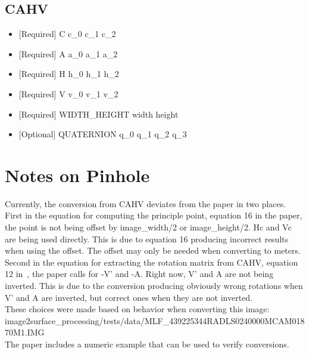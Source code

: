 \documentclass[float=false, crop=false]{standalone}
\begin{document}
\subsection{CAHV}
\begin{itemize}
	\item {[Required] C} c\_0 c\_1 c\_2\\
	\item {[Required] A} a\_0 a\_1 a\_2\\
	\item {[Required] H} h\_0 h\_1 h\_2\\
	\item {[Required] V} v\_0 v\_1 v\_2\\
	\item {[Required] WIDTH\_HEIGHT} width height\\
	\item {[Optional] QUATERNION} q\_0 q\_1 q\_2 q\_3
\end{itemize}

\section{Notes on Pinhole}
Currently, the conversion from CAHV deviates from the paper in two places.\\ First in the equation for computing the principle point, equation 16 in the paper, the point is not being offset by image\_width/2 or image\_height/2. Hc and Vc are being used directly. This is due to equation 16 producing incorrect results when using the offset. The offset may only be needed when converting to meters.\\
Second in the equation for extracting the rotation matrix from CAHV, equation 12 in~\cite{Di-Li-2003-cahvor}, the paper calls for -V' and -A. Right now, V' and A are not being inverted. This is due to the conversion producing obviously wrong rotations when V' and A are inverted, but correct ones when they are not inverted.\\
These choices were made based on behavior when converting this image:\\ image2surface\_processing/tests/data/MLF\_439225344RADLS0240000MCAM01870M1.IMG\\
The paper includes a numeric example that can be used to verify conversions.

\end{document}

